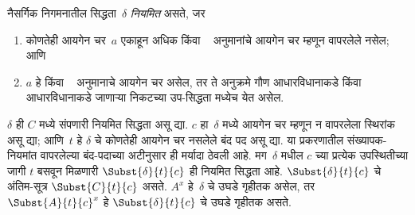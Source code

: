 \begin{defn}
नैसर्गिक निगमनातील
सिद्धता~$\delta$
\emph{नियमित} असते, जर
\begin{enumerate}
  \item कोणतेही आयगेन
  चर~$a$ एकाहून अधिक
  \Elim{\lexists} किंवा
  ~\Intro{\lforall} अनुमानांचे
  आयगेन चर म्हणून वापरलेले
  नसेल; आणि
  \item $a$ हे
  \Elim{\lexists} किंवा
  ~\Intro{\lforall} अनुमानाचे
  आयगेन चर असेल, तर ते
  अनुक्रमे गौण आधारविधानाकडे
  किंवा आधारविधानाकडे
  जाणाऱ्या निकटच्या
  उप-सिद्धता मध्येच
  येत असेल.
\end{enumerate}
\end{defn}

\begin{lem}\label{pt:nat:qua:lem:subst-regular}
$\delta$ ही $C$ मध्ये
संपणारी नियमित सिद्धता असू द्या.
$c$ हा~$\delta$ मध्ये
आयगेन चर म्हणून न वापरलेला
स्थिरांक असू द्या;
आणि~$t$ हे $\delta$
चे कोणतेही आयगेन चर नसलेले
बंद पद असू द्या. या प्रकरणातील संख्यापक-नियमांत
वापरलेल्या बंद-पदाच्या अटीनुसार ही मर्यादा ठेवली आहे. मग~$\delta$
मधील $c$ च्या प्रत्येक
उपस्थितीच्या जागी $t$
बसवून मिळणारी
$\Subst{\delta}{t}{c}$
ही नियमित सिद्धता आहे.
$\Subst{\delta}{t}{c}$
चे अंतिम-सूत्र
$\Subst{C}{t}{c}$ असते.
$A^x$ हे~$\delta$
चे उघडे गृहीतक असेल,
तर $\Subst{A}{t}{c}^x$
हे $\Subst{\delta}{t}{c}$
चे उघडे गृहीतक असते.
\end{lem}


